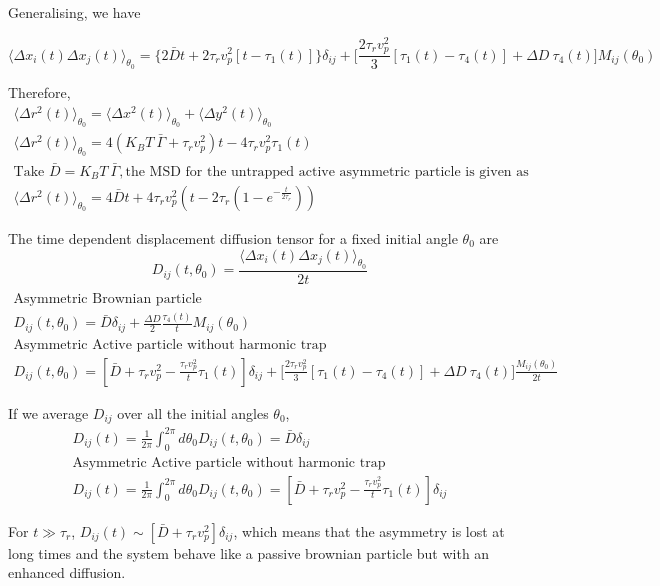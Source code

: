 \documentclass[]{article}
\begin{document}
Generalising, we have

\[\langle \Delta x_i(t)\Delta x_j(t) \rangle _{\theta_0}=\{ 2\bar D t+2\tau_r v_p^2[ t-\tau_1(t)]\}\delta_{ij} +\bigg[\frac{2\tau_rv_p^2}{3}  [\tau_1(t)-\tau_4(t)]+ \Delta D \  \tau_4(t) \bigg]M_{ij}(\theta_0)\]

Therefore,
\begin{align*}
\langle \Delta r^2(t) \rangle_{\theta_0}=\langle \Delta x^2(t) \rangle_{\theta_0}+\langle \Delta y^2(t) \rangle_{\theta_0}\\\langle \Delta r^2(t) \rangle_{\theta_0}=4(K_B T \ \bar\Gamma+ \tau_r v_p^2)t - 4\tau_r v_p^2 \tau_1(t)\\\text{Take } \bar D=  K_B T \ \bar\Gamma,\text{the MSD for the untrapped active asymmetric particle is given as}
\\\langle \Delta r^2(t) \rangle_{\theta_0}=4\bar D t+4\tau_r v_p^2(t-2\tau_r(1-e^{-\frac{t}{2\tau_r}}))    
\end{align*}
\newpage  

The time dependent displacement diffusion tensor for a fixed initial angle $\theta_0$ are$$D_{ij}(t,\theta_0)=\frac{\langle \Delta x_i(t)\Delta x_j(t) \rangle _{\theta_0}}{2t}$$
\begin{multline*}
\\\text{Asymmetric Brownian particle}
\\D_{ij}(t,\theta_0)=\bar D \delta_{ij}+ \frac{\Delta D}{2}\frac{\tau_4(t)}{t}M_{ij}(\theta_0)
\\\text{Asymmetric Active particle without harmonic trap}
\\D_{ij}(t,\theta_0)=[\bar D + \tau_r v_p^2-\frac{\tau_r v_p^2}{t}\tau_1(t)]\delta_{ij} +\bigg[\frac{2\tau_rv_p^2}{3}  [\tau_1(t)-\tau_4(t)]+ \Delta D \  \tau_4(t) \bigg]\frac{M_{ij}(\theta_0)}{2t}
\end{multline*} 

If we average $D_{ij}$ over all the initial angles $\theta_0$,
\begin{multline*}
D_{ij}(t)=\frac{1}{2\pi}\int_0^{2\pi}d\theta_0 D_{ij} (t,\theta_0) =\bar D \delta_{ij}
\\\text{Asymmetric Active particle without harmonic trap}
\\D_{ij}(t)=\frac{1}{2\pi}\int_0^{2\pi}d\theta_0 D_{ij} (t,\theta_0)=[\bar D + \tau_r v_p^2-\frac{\tau_r v_p^2}{t}\tau_1(t)]\delta_{ij}   
\end{multline*} 


For $t \gg \tau_r$,
$D_{ij}(t)\sim[\bar D + \tau_r v_p^2]\delta_{ij}$, which means that
the asymmetry is lost at long times and the system behave like a passive
brownian particle but with an enhanced diffusion.
\end{document}
